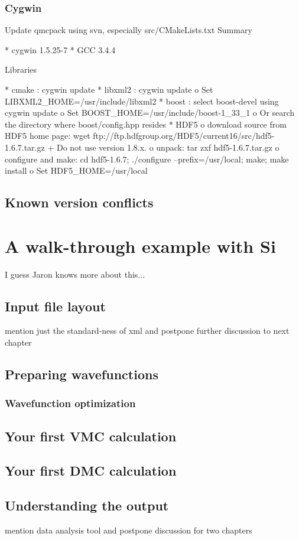 \subsubsection{Cygwin}
Update qmcpack using svn, especially src/CMakeLists.txt
 Summary

    * cygwin 1.5.25-7
    * GCC 3.4.4 

 Libraries

    * cmake : cygwin update
    * libxml2 : cygwin update
          o Set LIBXML2\_HOME=/usr/include/libxml2 
    * boost : select boost-devel using cygwin update
          o Set BOOST\_HOME=/usr/include/boost-1\_33\_1
          o Or search the directory where boost/config.hpp resides 
    * HDF5
          o download source from HDF5 home page:
            wget ftp://ftp.hdfgroup.org/HDF5/current16/src/hdf5-1.6.7.tar.gz
                + Do not use version 1.8.x. 
          o unpack:
            tar zxf hdf5-1.6.7.tar.gz
          o configure and make:
            cd hdf5-1.6.7; ./configure --prefix=/usr/local; make; make install
          o Set HDF5\_HOME=/usr/local 

\subsection{Known version conflicts}
\section{A walk-through example with Si}
I guess Jaron knows more about this...
\subsection{Input file layout}
mention just the standard-ness of xml and postpone further discussion to next chapter
\subsection{Preparing wavefunctions}
\subsubsection{Wavefunction optimization}
\subsection{Your first VMC calculation}
\subsection{Your first DMC calculation}
\subsection{Understanding the output}
mention data analysis tool and postpone discussion for two chapters
